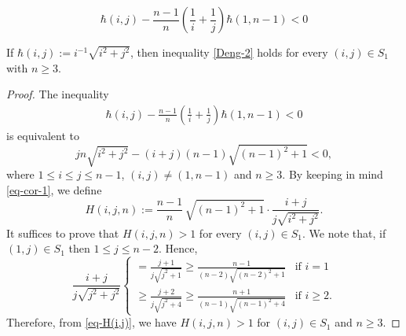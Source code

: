 \documentclass[10pt,a4paper]{amsart}
\begin{document}
\begin{equation}\label{Deng-2}
 \hbar(i,j)-\frac{n-1}{n}\left(\frac{1}{i}+\frac{1}{j}\right) \hbar(1, n-1)<0
\end{equation}

\begin{lemma}\label{cor-Sn}
If  $\hbar(i,j):=i^{-1}\sqrt{i^2+j^2}$, then inequality \eqref{Deng-2} holds for every $(i, j) \in S_1$ with $n\ge3$.
\end{lemma}

\begin{proof}
The inequality
\begin{align*}
\hbar(i,j)-\frac{n-1}{n}\left(\frac{1}{i}+\frac{1}{j}\right) \hbar(1, n-1)<0
\end{align*}
is equivalent to
\begin{equation}\label{eq-cor-1}
jn\sqrt{i^2+j^2}-(i+j)(n-1)\sqrt{(n-1)^2+1}<0,
\end{equation}
where $1 \leq i \leq j \leq n-1 $, $(i, j)\ne (1, n-1)$ and $n\ge3$. By keeping in mind \eqref{eq-cor-1}, we define
\begin{equation}\label{eq-H(i,j)}
H(i,j,n):=\frac{n-1}{n}\,\sqrt{(n-1)^2+1}\cdot\frac{i+j}{j\sqrt{i^2+j^2}}.
\end{equation}
It suffices to prove that $H(i,j,n)> 1$ for every $(i, j) \in S_1$. We note that, if $(1, j) \in S_1$ then $1\le j\le n-2$.   Hence,
\[
\frac{i+j}{j\sqrt{j^2+j^2}}
\begin{cases}
=\displaystyle \frac{j+1}{j\sqrt{j^2+1}}\ge \frac{n-1}{(n-2)\sqrt{(n-2)^2+1}}  & \text{if $i=1$}\\[5mm]
\ge\displaystyle\frac{j+2}{j\sqrt{j^2+4}}\ge \frac{n+1}{(n-1)\sqrt{(n-1)^2+4}} & \text{if $i\ge2$.}
\end{cases}
\]
Therefore, from \eqref{eq-H(i,j)}, we have $H(i,j,n)>1$ for $(i,j)\in S_1$ and $n\ge3$.
\end{proof}
\end{document}
